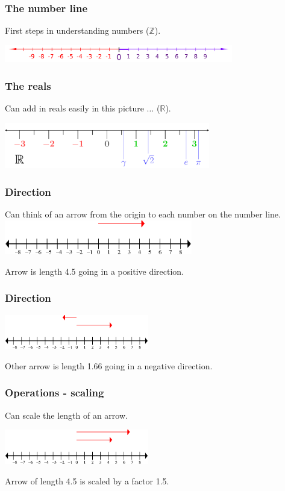 \documentclass[hyperref={colorlinks=true},xcolor=svgnames]{beamer}
\begin{document}
\begin{frame}
\frametitle{The number line}

First steps in understanding numbers ($\mathbb{Z}$).

\vskip1cm
\includegraphics[height=0.75cm]{../Figures/2000px-Number-line.png}


\end{frame}

\begin{frame}
\frametitle{The reals}

Can add in reals easily in this picture $\dots$ ($\mathbb{R}$).

\vskip1cm
\includegraphics[height=2cm]{../Figures/Real_Number_line.png}


\end{frame}

\begin{frame}
\frametitle{Direction}

Can think of an arrow  from the origin to each  number on the number line.
\vskip1cm
\includegraphics[height=1.5cm]{../Figures/1dvector.png}

Arrow is length 4.5 going in a positive direction. 

\end{frame}


\begin{frame}
\frametitle{Direction}


\vskip1cm
\includegraphics[height=1.5cm]{../Figures/1dvectorExample2.png}

Other arrow is length 1.66 going in a negative direction. 

\end{frame}

\begin{frame}
\frametitle{Operations - scaling}

Can scale the length of an arrow.
 
\vskip1cm
\includegraphics[height=1.5cm]{../Figures/1dvectorScaled.png}

Arrow of length 4.5 is scaled by a factor 1.5.

\end{frame}
\end{document}
